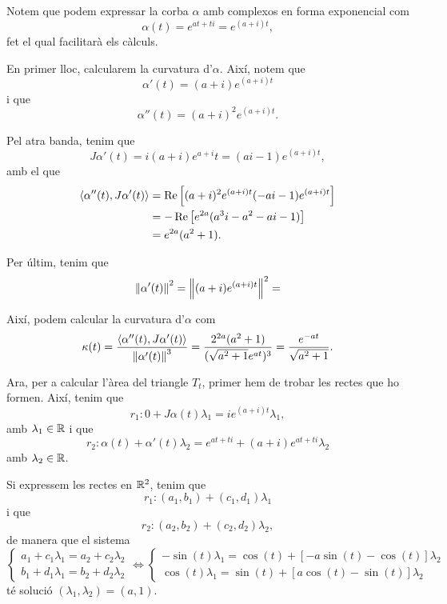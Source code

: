 \documentclass[a4paper, 11pt]{article}
\begin{document}
  \begin{solution}
    Notem que podem expressar la corba $\alpha$ amb complexos en forma
    exponencial com
    \[
      \alpha(t) = e^{at + ti} = e^{(a + i)t},
    \]
    fet el qual facilitarà els càlculs.

    En primer lloc, calcularem la curvatura d'$\alpha$. Així, notem que
    \[
      \alpha'(t) = (a + i)e^{(a + i)t}
    \]
    i que
    \[
      \alpha''(t) = (a + i)^2e^{(a + i)t}.
    \]

    Pel atra banda, tenim que
    \[
      J \alpha'(t) = i (a + i)e^{a + i}t =
      (ai - 1)e^{(a + i)t},
    \]
    amb el que
    \[
      \begin{split}
        \left\langle\alpha''(t), J \alpha'(t)\right\rangle
        &= \operatorname{Re}\left[(a + i)^2e^{(a + i)t}
        (-ai - 1)e^{(a + i)t}\right] \\
        &= -\operatorname{Re}\left[e^{2a}(a^3i -a^2 -ai - 1)\right] \\
        &= e^{2a} (a^2 + 1).
      \end{split} 
    \]

    Per últim, tenim que
    \[
      \left\lVert\alpha'(t)\right\rVert^2 = \left\lVert(a + i)e^{(a + i)t}\right\rVert^2 =
    \]

    Així, podem calcular la curvatura d'$\alpha$ com
    \[
      \kappa(t) = \frac{\gen{\alpha''(t), J \alpha'(t)}}%
      {\norm{\alpha'(t)}^3}
      = \frac{2^{2a}(a^2 + 1)}{(\sqrt{a^2 + 1}e^{at})^3}
      = \frac{e^{-at}}{\sqrt{a^2 + 1}}.
    \]
    
    Ara, per a calcular l'àrea del triangle $T_t$, primer hem de trobar
    les rectes que ho formen. Així, tenim que
    \[
      r_1: 0 + J \alpha(t)\lambda_1 = i e^{(a+i)t} \lambda_1,
    \]
    amb $\lambda_1 \in \mathbb{R}$ i que
    \[
      r_2: \alpha(t) + \alpha'(t) \lambda_2 =
      e^{at + ti} + (a + i)e^{at + ti} \lambda_2
    \]
    amb $\lambda_2 \in \mathbb{R}$.

    Si expressem les rectes en $\mathbb{R}^2$, tenim que
    \[
      r_1: (a_1, b_1) + (c_1, d_1) \lambda_1
    \]
    i que
    \[
      r_2: (a_2, b_2) + (c_2, d_2) \lambda_2,
    \]
    de manera que el sistema
    \[
      \begin{cases}
        a_1 + c_1 \lambda_1 = a_2 + c_2 \lambda_2 \\
        b_1 + d_1 \lambda_1 = b_2 + d_2 \lambda_2
      \end{cases}
      \iff
      \begin{cases}
        -\sin (t) \lambda_1 = \cos (t) +
        \left[-a\sin (t) - \cos (t)\right] \lambda_2 \\
        \cos (t) \lambda_1 = \sin (t) +
        \left[a\cos (t) - \sin (t)\right] \lambda_2
      \end{cases}
    \]
    té solució $(\lambda_1, \lambda_2) = (a, 1)$.


\end{solution}
\end{document}
